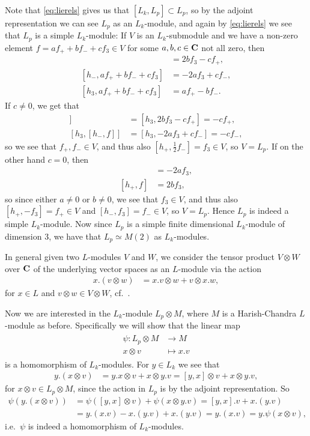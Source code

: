 Note that \cref{eq:lierels} gives us that $[L_k,L_p]\subset L_p$, so by the adjoint representation we can see $L_p$ as an $L_k$-module, and again by \cref{eq:lierels} we see that $L_p$ is a simple $L_k$-module: If $V$ is an $L_k$-submodule and we have a non-zero element $f=af_++bf_-+cf_3\in V$ for some $a,b,c\in\mathbf{C}$ not all zero, then
\begin{align*}
  [h_+,af_++bf_-+cf_3] &= 2bf_3-cf_+, \\
  [h_-,af_++bf_-+cf_3] &= -2af_3+cf_-, \\
  [h_3,af_++bf_-+cf_3] &= af_+-bf_-.
\end{align*}
If $c\neq0$, we get that
\begin{align*}
  [h_3,[h_+,f]] &= [h_3,2bf_3-cf_+] = -cf_+, \\
  [h_3,[h_-,f]] &= [h_3,-2af_3+cf_-] = -cf_-,
\end{align*}
so we see that $f_+,f_-\in V$, and thus also $[h_+,\tfrac{1}{2}f_-]=f_3\in V$, so $V=L_p$. If on the other hand $c=0$, then
\begin{align*}
  [h_-,f] &= -2af_3, \\
  [h_+,f] &= 2bf_3,
\end{align*}
so since either $a\neq 0$ or $b\neq 0$, we see that $f_3\in V$, and thus also $[h_+,-f_3]=f_+\in V$ and $[h_-,f_3]=f_-\in V$, so $V=L_p$. Hence $L_p$ is indeed a simple $L_k$-module. Now since $L_p$ is a simple finite dimensional $L_k$-module of dimension 3, we have that $L_p\simeq M(2)$ as $L_k$-modules.

In general given two $L$-modules $V$ and $W$, we consider the tensor product $V\otimes W$ over $\mathbf{C}$ of the underlying vector spaces as an $L$-module via the action
\begin{align*}
  x.(v\otimes w) &= x.v\otimes w + v\otimes x.w,
\end{align*}
for $x\in L$ and $v\otimes w\in V\otimes W$, cf.\ \cite[26]{humphrey}.

Now we are interested in the $L_k$-module $L_p\otimes M$, where $M$ is a Harish-Chandra $L$-module as before. Specifically we will show that the linear map
\begin{align}
  \begin{split} \label{eq:psi}
    \psi \colon L_p\otimes M &\to M \\
    x\otimes v &\mapsto x.v
  \end{split}
\end{align}
is a homomorphism of $L_k$-modules. For $y\in L_k$ we see that
\begin{align*}
  y.(x\otimes v) &= y.x\otimes v + x\otimes y.v = [y,x]\otimes v + x\otimes y.v,
\end{align*}
for $x\otimes v\in L_p\otimes M$, since the action in $L_p$ is by the adjoint representation. So
\begin{align*}
  \psi(y.(x\otimes v)) &= \psi([y,x]\otimes v) + \psi(x\otimes y.v) = [y,x].v + x.(y.v) \\
  &= y.(x.v)-x.(y.v)+x.(y.v) = y.(x.v) = y.\psi(x\otimes v),
\end{align*}
i.e.\ $\psi$ is indeed a homomorphism of $L_k$-modules.

